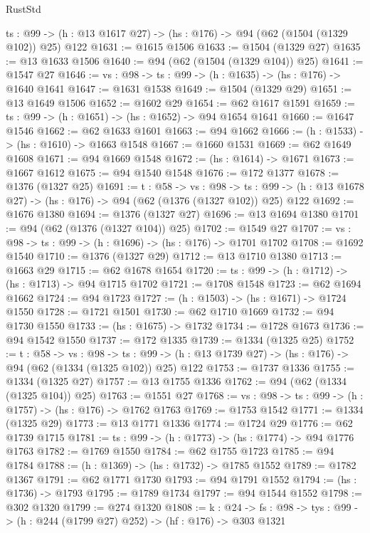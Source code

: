\begin{lexlean}{RustStd}
\begin{coremodule}
  {ts : @99} -> (h : @13 @1617 @27) -> (hs : @176) -> @94 (@62 (@1504 (@1329 @102)) @25) @122
@1631 := @1615 @1506
@1633 := @1504 (@1329 @27)
@1635 := @13 @1633 @1506
@1640 := @94 (@62 (@1504 (@1329 @104)) @25)
@1641 := @1547 @27
@1646 := {vs : @98} -> {ts : @99} -> (h : @1635) -> (hs : @176) -> @1640 @1641
@1647 := @1631 @1538
@1649 := @1504 (@1329 @29)
@1651 := @13 @1649 @1506
@1652 := @1602 @29
@1654 := @62 @1617 @1591
@1659 := {ts : @99} -> (h : @1651) -> (hs : @1652) -> @94 @1654 @1641
@1660 := @1647 @1546
@1662 := @62 @1633 @1601
@1663 := @94 @1662
@1666 := (h : @1533) -> (hs : @1610) -> @1663 @1548
@1667 := @1660 @1531
@1669 := @62 @1649 @1608
@1671 := @94 @1669 @1548
@1672 := (hs : @1614) -> @1671
@1673 := @1667 @1612
@1675 := @94 @1540 @1548
@1676 := @172 @1377
@1678 := @1376 (@1327 @25)
@1691 := {t : @58} ->
  {vs : @98} ->
  {ts : @99} -> (h : @13 @1678 @27) -> (hs : @176) -> @94 (@62 (@1376 (@1327 @102)) @25) @122
@1692 := @1676 @1380
@1694 := @1376 (@1327 @27)
@1696 := @13 @1694 @1380
@1701 := @94 (@62 (@1376 (@1327 @104)) @25)
@1702 := @1549 @27
@1707 := {vs : @98} -> {ts : @99} -> (h : @1696) -> (hs : @176) -> @1701 @1702
@1708 := @1692 @1540
@1710 := @1376 (@1327 @29)
@1712 := @13 @1710 @1380
@1713 := @1663 @29
@1715 := @62 @1678 @1654
@1720 := {ts : @99} -> (h : @1712) -> (hs : @1713) -> @94 @1715 @1702
@1721 := @1708 @1548
@1723 := @62 @1694 @1662
@1724 := @94 @1723
@1727 := (h : @1503) -> (hs : @1671) -> @1724 @1550
@1728 := @1721 @1501
@1730 := @62 @1710 @1669
@1732 := @94 @1730 @1550
@1733 := (hs : @1675) -> @1732
@1734 := @1728 @1673
@1736 := @94 @1542 @1550
@1737 := @172 @1335
@1739 := @1334 (@1325 @25)
@1752 := {t : @58} ->
  {vs : @98} ->
  {ts : @99} -> (h : @13 @1739 @27) -> (hs : @176) -> @94 (@62 (@1334 (@1325 @102)) @25) @122
@1753 := @1737 @1336
@1755 := @1334 (@1325 @27)
@1757 := @13 @1755 @1336
@1762 := @94 (@62 (@1334 (@1325 @104)) @25)
@1763 := @1551 @27
@1768 := {vs : @98} -> {ts : @99} -> (h : @1757) -> (hs : @176) -> @1762 @1763
@1769 := @1753 @1542
@1771 := @1334 (@1325 @29)
@1773 := @13 @1771 @1336
@1774 := @1724 @29
@1776 := @62 @1739 @1715
@1781 := {ts : @99} -> (h : @1773) -> (hs : @1774) -> @94 @1776 @1763
@1782 := @1769 @1550
@1784 := @62 @1755 @1723
@1785 := @94 @1784
@1788 := (h : @1369) -> (hs : @1732) -> @1785 @1552
@1789 := @1782 @1367
@1791 := @62 @1771 @1730
@1793 := @94 @1791 @1552
@1794 := (hs : @1736) -> @1793
@1795 := @1789 @1734
@1797 := @94 @1544 @1552
@1798 := @302 @1320
@1799 := @274 @1320
@1808 := {k : @24} ->
  {fs : @98} -> {tys : @99} -> (h : @244 (@1799 @27) @252) -> (hf : @176) -> @303 @1321

\end{coremodule}
\end{lexlean}
